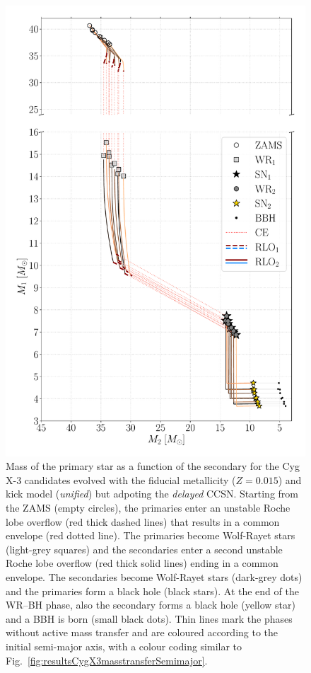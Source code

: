 \documentclass[a4paper,titlepage]{book}     	%
\begin{document}
\begin{appendices}
\begin{figure}
	\centering
	\includegraphics[width=.9\textwidth]{./images/del_Mass_1_Mass_0_BHBH_GW_WRBH_cyg_x-3--Ko17.pdf}
	\caption{Mass of the primary star as a function of the secondary for the Cyg X-3 candidates evolved with the fiducial metallicity ($Z=0.015$) and kick model (\emph{unified}) but adpoting the \emph{delayed} CCSN. Starting from the ZAMS (empty circles), the primaries enter an unstable Roche lobe overflow (red thick dashed lines) that results in a common envelope (red dotted line). The primaries become Wolf-Rayet stars (light-grey squares) and the secondaries enter a second unstable Roche lobe overflow (red thick solid lines) ending in a common envelope. The secondaries become Wolf-Rayet stars (dark-grey dots) and the primaries form a black hole (black stars). At the end of the WR--BH phase, also the secondary forms a black hole (yellow star) and a BBH is born (small black dots). Thin lines mark the phases without active mass transfer and are coloured according to the initial semi-major axis, with a colour coding similar to Fig.\ \ref{fig:resultsCygX3masstransferSemimajor}.}\label{fig:resultsCygX3masstransferM1M2delayed}
\end{figure}









\end{appendices}
\end{document}
